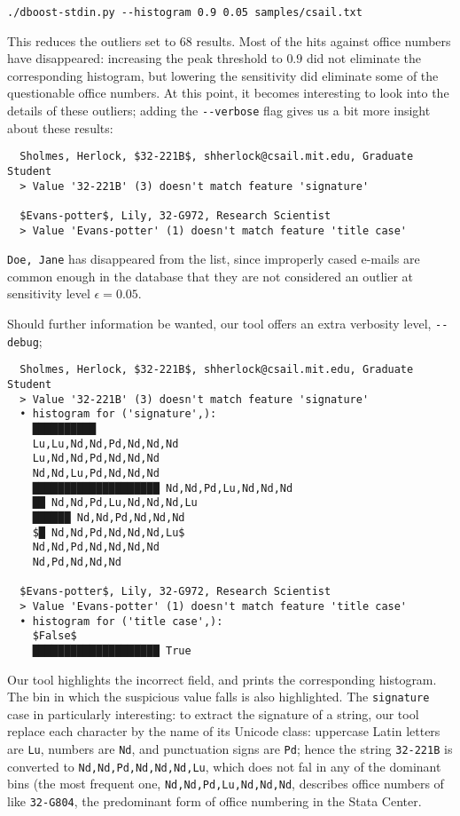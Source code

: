 \begin{lstlisting}
./dboost-stdin.py --histogram 0.9 0.05 samples/csail.txt
\end{lstlisting}

This reduces the outliers set to $68$ results. Most of the hits against office numbers have disappeared: increasing the peak threshold to $0.9$ did not eliminate the corresponding histogram, but lowering the sensitivity did eliminate some of the questionable office numbers. At this point, it becomes interesting to look into the details of these outliers; adding the \lstinline{--verbose} flag gives us a bit more insight about these results:

\begin{lstlisting}
  Sholmes, Herlock, $32-221B$, shherlock@csail.mit.edu, Graduate Student
  > Value '32-221B' (3) doesn't match feature 'signature'
 
  $Evans-potter$, Lily, 32-G972, Research Scientist
  > Value 'Evans-potter' (1) doesn't match feature 'title case'  
\end{lstlisting}

\lstinline{Doe, Jane} has disappeared from the list, since improperly cased e-mails are common enough in the database that they are not considered an outlier at sensitivity level $\epsilon = 0.05$.
 
Should further information be wanted, our tool offers an extra verbosity level, \lstinline{--debug};

\begin{lstlisting}
  Sholmes, Herlock, $32-221B$, shherlock@csail.mit.edu, Graduate Student
  > Value '32-221B' (3) doesn't match feature 'signature'
  • histogram for ('signature',):
    ██████████ 
    Lu,Lu,Nd,Nd,Pd,Nd,Nd,Nd
    Lu,Nd,Nd,Pd,Nd,Nd,Nd
    Nd,Nd,Lu,Pd,Nd,Nd,Nd
    ████████████████████ Nd,Nd,Pd,Lu,Nd,Nd,Nd
    ██ Nd,Nd,Pd,Lu,Nd,Nd,Nd,Lu
    ██████ Nd,Nd,Pd,Nd,Nd,Nd
    $█ Nd,Nd,Pd,Nd,Nd,Nd,Lu$
    Nd,Nd,Pd,Nd,Nd,Nd,Nd
    Nd,Pd,Nd,Nd,Nd

  $Evans-potter$, Lily, 32-G972, Research Scientist
  > Value 'Evans-potter' (1) doesn't match feature 'title case'  
  • histogram for ('title case',):
    $False$
    ████████████████████ True
\end{lstlisting}

Our tool highlights the incorrect field, and prints the corresponding histogram. The bin in which the suspicious value falls is also highlighted. The \lstinline{signature} case in particularly interesting: to extract the signature of a string, our tool replace each character by the name of its Unicode class: uppercase Latin letters are \lstinline{Lu}, numbers are \lstinline{Nd}, and punctuation signs are \lstinline{Pd}; hence the string \lstinline{32-221B} is converted to \lstinline{Nd,Nd,Pd,Nd,Nd,Nd,Lu}, which does not fal in any of the dominant bins (the most frequent one, \lstinline{Nd,Nd,Pd,Lu,Nd,Nd,Nd}, describes office numbers of like \lstinline{32-G804}, the predominant form of office numbering in the Stata Center.  

